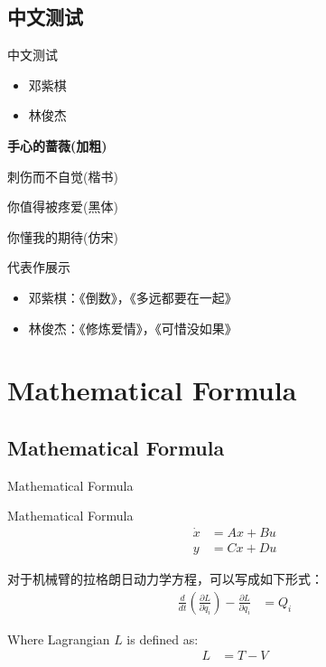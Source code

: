 \documentclass[xcolor=x11names,compress]{ctexbeamer}
\begin{document}
\subsection{中文测试}
\begin{frame}{中文测试}
\vspace{-2cm}
\hspace{3cm}
\begin{itemize}
  \item 邓紫棋
  \item 林俊杰
\end{itemize}

\begin{center}
  \textbf{手心的蔷薇(加粗)}

  \selectfont \kaishu 刺伤而不自觉(楷书)
  
  \selectfont \heiti 你值得被疼爱(黑体)
  
  \selectfont \fangsong 你懂我的期待(仿宋)
\end{center}

\begin{block}{代表作展示}
  \begin{itemize}
    \item 邓紫棋：《倒数》，《多远都要在一起》
    \item 林俊杰：《修炼爱情》，《可惜没如果》
  \end{itemize}
\end{block}

\end{frame}  

\section{Mathematical Formula}
\subsection{Mathematical Formula}
\begin{frame}{Mathematical Formula}
\begin{block}{Mathematical Formula}
  \begin{equation}
    \begin{aligned}
      \dot{x} &= Ax + Bu \\
      y &= Cx + Du
    \end{aligned}
  \end{equation}
\end{block}

对于机械臂的拉格朗日动力学方程，可以写成如下形式：
\begin{equation}
  \begin{aligned}
    \frac{d}{dt}(\frac{\partial L}{\partial \dot{q}_i}) - \frac{\partial L}{\partial q_i} &= Q_i
  \end{aligned}
\end{equation}

Where Lagrangian $L$ is defined as:
\begin{equation}
  \begin{aligned}
    L &= T - V
  \end{aligned}
\end{equation}
\end{frame}
\end{document}
